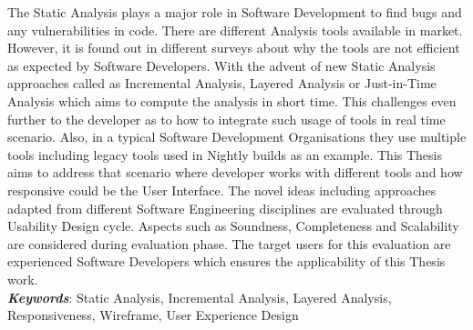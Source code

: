 The Static Analysis plays a major role in Software Development to find bugs and any vulnerabilities in code. There are different Analysis tools available in market. However, it is found out in different surveys about why the tools are not efficient as expected by Software Developers. With the advent of new Static Analysis approaches called as Incremental Analysis, Layered Analysis or Just-in-Time Analysis which aims to compute the analysis in short time. This challenges even further to the developer as to how to integrate such usage of tools in real time scenario. Also, in a typical Software Development Organisations they use multiple tools including legacy tools used in Nightly builds as an example. This Thesis aims to address that scenario where developer works with different tools and how responsive could be the User Interface. The novel ideas including approaches adapted from different Software Engineering disciplines are evaluated through Usability Design cycle. Aspects such as Soundness, Completeness and Scalability are considered during evaluation phase. The target users for this evaluation are experienced Software Developers which ensures the applicability of this Thesis work. \\
\textbf{\textit{Keywords}}: Static Analysis, Incremental Analysis, Layered Analysis, Responsiveness, Wireframe, User Experience Design
